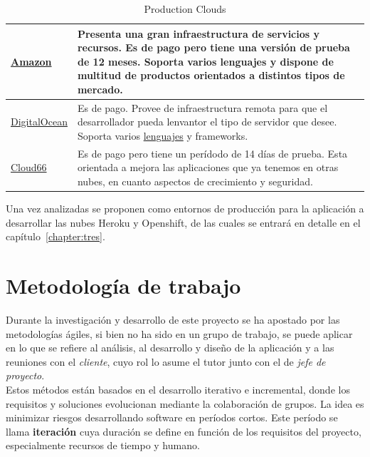 \begin{table}[H]
\begin{tabular}{p{2cm} p{8cm}}
	\hline
	\href{https://aws.amazon.com/es/?nc2=h_lg}{Amazon} & Presenta una gran infraestructura de servicios y recursos. Es de pago pero tiene una versión de prueba de 12 meses. Soporta varios lenguajes y dispone de multitud de productos orientados a distintos tipos de mercado. \\
	\hline
	\href{https://www.digitalocean.com/}{DigitalOcean} & Es de pago. Provee de infraestructura remota para que el desarrollador pueda lenvantor el tipo de servidor que desee. Soporta varios \href{https://www.digitalocean.com/community/}{lenguajes} y frameworks. \\
	\hline
	\href{http://www.cloud66.com/}{Cloud66} & Es de pago pero tiene un perídodo de 14 días de prueba. Esta orientada a mejora las aplicaciones que ya tenemos en otras nubes, en cuanto aspectos de crecimiento y seguridad. \\
	\hline
	\end{tabular}
	\caption{Production Clouds}
	\label{tabla:clouds}
\end{table}

Una vez analizadas se proponen como entornos de producción para la aplicación a desarrollar las nubes Heroku y Openshift, de las cuales se entrará en detalle en el capítulo~\ref{chapter:tres}.


\vspace*{0.2in}
\section{Metodología de trabajo}\label{cap.1.3}

\vspace*{0.1in}
Durante la investigación y desarrollo de este proyecto se ha apostado por las metodologías ágiles, si bien no ha sido en un grupo de trabajo, se puede aplicar en lo que se refiere al análisis, al desarrollo y diseño de la aplicación y a las reuniones con el \emph{cliente}, cuyo rol lo asume el tutor junto con el de \emph{jefe de proyecto}. \\

Estos métodos están basados en el desarrollo iterativo e incremental, donde los requisitos y soluciones evolucionan mediante la colaboración de grupos. La idea es minimizar riesgos desarrollando software en períodos cortos. Este período se llama \textbf{iteración} cuya duración se define en función de los requisitos del proyecto, especialmente recursos de tiempo y humano. \\

